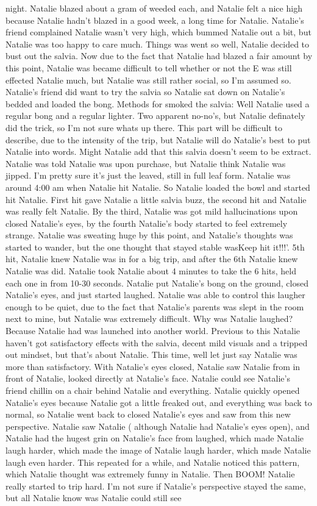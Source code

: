 \documentclass[12pt]{book}
\begin{document}
night. Natalie blazed about a gram of weeded each, and Natalie felt a nice high because Natalie hadn't blazed in a good week, a long time for Natalie. Natalie's friend complained Natalie wasn't very high, which bummed Natalie out a bit, but Natalie was too happy to care much. Things was went so well, Natalie decided to bust out the salvia. Now due to the fact that Natalie had blazed a fair amount by this point, Natalie was became difficult to tell whether or not the E was still effected Natalie much, but Natalie was still rather social, so I'm assumed so. Natalie's friend did want to try the salvia so Natalie sat down on Natalie's bedded and loaded the bong. Methods for smoked the salvia: Well Natalie used a regular bong and a regular lighter. Two apparent no-no's, but Natalie definately did the trick, so I'm not sure whats up there. This part will be difficult to describe, due to the intensity of the trip, but Natalie will do Natalie's best to put Natalie into words. Might Natalie add that this salvia doesn't seem to be extract. Natalie was told Natalie was upon purchase, but Natalie think Natalie was jipped. I'm pretty sure it's just the leaved, still in full leaf form. Natalie was around 4:00 am when Natalie hit Natalie. So Natalie loaded the bowl and started hit Natalie. First hit gave Natalie a little salvia buzz, the second hit and Natalie was really felt Natalie. By the third, Natalie was got mild hallucinations upon closed Natalie's eyes, by the fourth Natalie's body started to feel extremely strange. Natalie was sweating huge by this point, and Natalie's thoughts was started to wander, but the one thought that stayed stable wasKeep hit it!!!'. 5th hit, Natalie knew Natalie was in for a big trip, and after the 6th Natalie knew Natalie was did. Natalie took Natalie about 4 minutes to take the 6 hits, held each one in from 10-30 seconds. Natalie put Natalie's bong on the ground, closed Natalie's eyes, and just started laughed. Natalie was able to control this laugher enough to be quiet, due to the fact that Natalie's parents was slept in the room next to mine, but Natalie was extremely difficult. Why was Natalie laughed? Because Natalie had was launched into another world. Previous to this Natalie haven't got satisfactory effects with the salvia, decent mild visuals and a tripped out mindset, but that's about Natalie. This time, well let just say Natalie was more than satisfactory. With Natalie's eyes closed, Natalie saw Natalie from in front of Natalie, looked directly at Natalie's face. Natalie could see Natalie's friend chillin on a chair behind Natalie and everything. Natalie quickly opened Natalie's eyes because Natalie got a little freaked out, and everything was back to normal, so Natalie went back to closed Natalie's eyes and saw from this new perspective. Natalie saw Natalie ( although Natalie had Natalie's eyes open), and Natalie had the hugest grin on Natalie's face from laughed, which made Natalie laugh harder, which made the image of Natalie laugh harder, which made Natalie laugh even harder. This repeated for a while, and Natalie noticed this pattern, which Natalie thought was extremely funny in Natalie. Then BOOM! Natalie really started to trip hard. I'm not sure if Natalie's perspective stayed the same, but all Natalie know was Natalie could still see 
\end{document}
